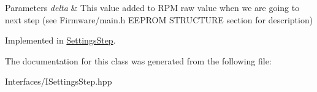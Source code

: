 \begin{DoxyParams}{Parameters}
{\em delta} & This value added to R\+PM raw value when we are going to next step (see Firmware/main.\+h E\+E\+P\+R\+OM S\+T\+R\+U\+C\+T\+U\+RE section for description) \\
\hline
\end{DoxyParams}


Implemented in \hyperlink{class_settings_step_a25ddaf1d4d77727b8f87b5f8588f2de1}{Settings\+Step}.



The documentation for this class was generated from the following file\+:\begin{DoxyCompactItemize}
\item 
Interfaces/I\+Settings\+Step.\+hpp\end{DoxyCompactItemize}
